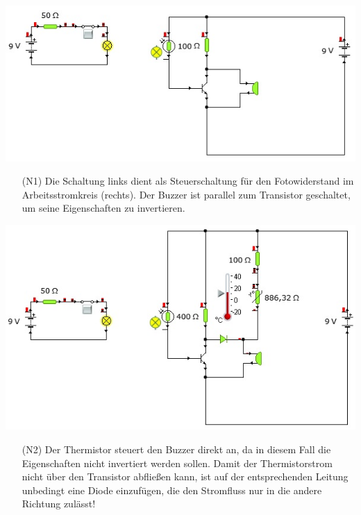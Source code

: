 \begin{Loesung}
\hfill \par
\begin{center}
\includegraphics[scale=.8]{pics/TransistorKomplexN1}
\end{center}

\begin{itemize}
\item[(N1)] Die Schaltung links dient als Steuerschaltung für den Fotowiderstand im Arbeitsstromkreis (rechts). Der Buzzer ist parallel zum Transistor geschaltet, um seine Eigenschaften zu invertieren.
\end{itemize}

\begin{center}
\includegraphics[scale=.8]{pics/TransistorKomplexN2}
\end{center}

\begin{itemize}
\item[(N2)] Der Thermistor steuert den Buzzer direkt an, da in diesem Fall die Eigenschaften nicht invertiert werden sollen. Damit der Thermistorstrom nicht über den Transistor abfließen kann, ist auf der entsprechenden Leitung unbedingt eine Diode einzufügen, die den Stromfluss nur in die andere Richtung zulässt!
\end{itemize}


\end{Loesung}
